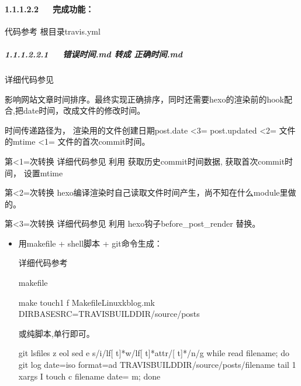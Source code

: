 \documentclass[letterpaper,12pt,english]{sphinxmanual}
\begin{document}
\paragraph{1.1.1.2.2   完成功能：}
\label{\detokenize{001software/001install/001._u7f51_u7ad9/gitpage:id4}}
代码参考 根目录travis.yml


\subparagraph{1.1.1.2.2.1   错误时间.md 转成 正确时间.md}
\label{\detokenize{001software/001install/001._u7f51_u7ad9/gitpage:md-md}}
详细代码参见 

影响网站文章时间排序。最终实现正确排序，同时还需要hexo的渲染前的hook配合,把date时间，改成文件的修改时间。

时间传递路径为，
渲染用的文件创建日期post.date \textless{}3= post.updated \textless{}2= 文件的mtime \textless{}1= 文件的首次commit时间。

第\textless{}1=次转换
详细代码参见 
利用  获取历史commit时间数据,
 获取首次commit时间，
 设置mtime

第\textless{}2=次转换
hexo编译渲染时自己读取文件时间产生，尚不知在什么module里做的。

第\textless{}3=次转换
详细代码参见 
利用 hexo钩子before\_post\_render 替换。
\begin{itemize}
\item {} 
用makefile + shell脚本 + git命令生成：

详细代码参考 

makefile

\begin{sphinxVerbatim}[commandchars=\\\{\}]
make touch1 \PYGZhy{}f MakefileLinuxkblog.mk DIR\PYGZus{}BASE\PYGZus{}SRC=\PYGZdl{}TRAVIS\PYGZus{}BUILD\PYGZus{}DIR/source/\PYGZus{}posts
\end{sphinxVerbatim}

或纯脚本,单行即可。

\begin{sphinxVerbatim}[commandchars=\\\{\}]
git ls\PYGZhy{}files \PYGZhy{}z \PYGZhy{}\PYGZhy{}eol \textbar{} sed \PYGZhy{}e \PYGZdq{}s/i\PYGZbs{}\PYGZbs{}/lf[ \PYGZbs{}\PYGZbs{}t]*w\PYGZbs{}\PYGZbs{}/lf[ \PYGZbs{}\PYGZbs{}t]*attr\PYGZbs{}\PYGZbs{}/[ \PYGZbs{}\PYGZbs{}t]*/\PYGZbs{}\PYGZbs{}n/g\PYGZdq{} \textbar{} while read filename; do git log \PYGZhy{}\PYGZhy{}date=iso \PYGZhy{}\PYGZhy{}format=\PYGZdq{}\PYGZpc{}ad\PYGZdq{} \PYGZhy{}\PYGZhy{} \PYGZdq{}\PYGZdl{}TRAVIS\PYGZus{}BUILD\PYGZus{}DIR/source/\PYGZus{}posts/\PYGZdl{}filename\PYGZdq{} \textbar{} tail \PYGZhy{}1 \textbar{} xargs \PYGZhy{}I\PYGZob{}\PYGZcb{} touch \PYGZhy{}c \PYGZdl{}filename \PYGZhy{}\PYGZhy{}date=\PYGZdq{}\PYGZob{}\PYGZcb{}\PYGZdq{} \PYGZhy{}m; done
\end{sphinxVerbatim}

\end{itemize}
\end{document}
